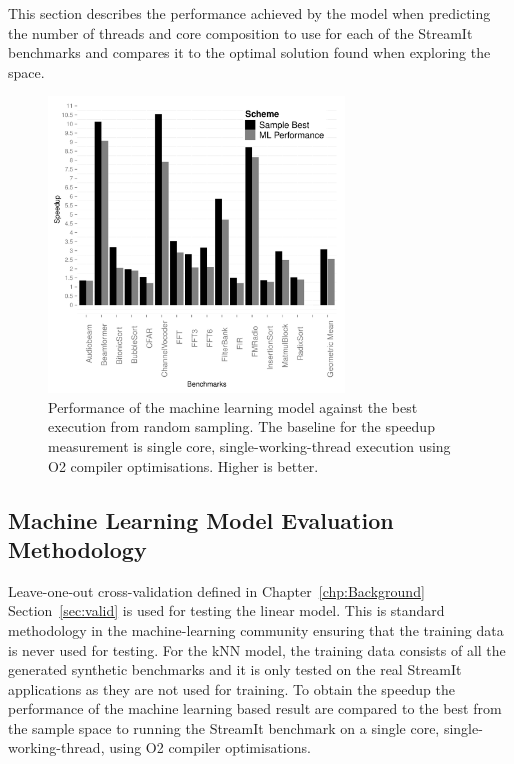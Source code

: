 This section describes the performance achieved by the model when predicting the number of threads and core composition to use for each of the StreamIt benchmarks and compares it to the optimal solution found when exploring the space.

\begin{figure}[t]
    \centering
    \includegraphics[width=0.7\textwidth]{streamit-paper/graphics/results.pdf}
    \caption{Performance of the machine learning model against the best execution from random sampling. The baseline for the speedup measurement is single core, single-working-thread execution using O2 compiler optimisations. Higher is better.}\label{fig:results}
\end{figure}

\subsection{Machine Learning Model Evaluation Methodology}

Leave-one-out cross-validation defined in Chapter~\ref{chp:Background} Section~\ref{sec:valid} is used for testing the linear model.
This is standard methodology in the machine-learning community ensuring that the training data is never used for testing.
For the kNN model, the training data consists of all the generated synthetic benchmarks and it is only tested on the real StreamIt applications as they are not used for training.
To obtain the speedup the performance of the machine learning based result are compared to the best from the sample space to running the StreamIt benchmark on a single core, single-working-thread, using O2 compiler optimisations. 

